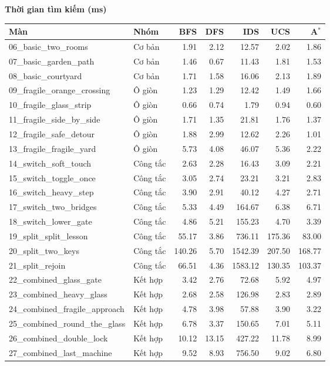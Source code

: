 \vspace{1.1em}

{\textbf{Thời gian tìm kiếm (ms)}}\\[0.4em]
\begin{tabular}{llrrrrr}
\hline
Màn & Nhóm & BFS & DFS & IDS & UCS & A$^*$ \\
\hline
06\_basic\_two\_rooms & Cơ bản & 1.91 & 2.12 & 12.57 & 2.02 & 1.86 \\
07\_basic\_garden\_path & Cơ bản & 1.46 & 0.67 & 11.43 & 1.81 & 1.53 \\
08\_basic\_courtyard & Cơ bản & 1.71 & 1.58 & 16.06 & 2.13 & 1.89 \\
09\_fragile\_orange\_crossing & Ô giòn & 1.23 & 1.29 & 12.42 & 1.49 & 1.66 \\
10\_fragile\_glass\_strip & Ô giòn & 0.66 & 0.74 & 1.79 & 0.94 & 0.60 \\
11\_fragile\_side\_by\_side & Ô giòn & 1.71 & 1.35 & 21.81 & 1.76 & 1.37 \\
12\_fragile\_safe\_detour & Ô giòn & 1.88 & 2.99 & 12.62 & 2.26 & 1.01 \\
13\_fragile\_fragile\_yard & Ô giòn & 5.73 & 4.08 & 46.07 & 5.36 & 2.22 \\
14\_switch\_soft\_touch & Công tắc & 2.63 & 2.28 & 16.43 & 3.09 & 2.21 \\
15\_switch\_toggle\_once & Công tắc & 3.05 & 2.74 & 23.21 & 3.21 & 2.83 \\
16\_switch\_heavy\_step & Công tắc & 3.90 & 2.91 & 40.12 & 4.27 & 2.71 \\
17\_switch\_two\_bridges & Công tắc & 5.33 & 4.49 & 164.67 & 6.38 & 6.71 \\
18\_switch\_lower\_gate & Công tắc & 4.86 & 5.21 & 155.23 & 4.70 & 3.39 \\
19\_split\_split\_lesson & Công tắc & 55.17 & 3.86 & 736.11 & 175.36 & 83.00 \\
20\_split\_two\_keys & Công tắc & 140.26 & 5.70 & 1542.39 & 207.50 & 168.77 \\
21\_split\_rejoin & Công tắc & 66.51 & 4.36 & 1583.12 & 130.35 & 103.37 \\
22\_combined\_glass\_gate & Kết hợp & 3.42 & 2.76 & 72.68 & 5.92 & 4.97 \\
23\_combined\_heavy\_glass & Kết hợp & 2.68 & 2.58 & 126.98 & 2.83 & 2.89 \\
24\_combined\_fragile\_approach & Kết hợp & 4.78 & 3.98 & 57.88 & 3.90 & 3.22 \\
25\_combined\_round\_the\_glass & Kết hợp & 6.78 & 3.37 & 150.65 & 7.01 & 5.11 \\
26\_combined\_double\_lock & Kết hợp & 10.12 & 13.15 & 427.22 & 11.78 & 8.99 \\
27\_combined\_last\_machine & Kết hợp & 9.52 & 8.93 & 756.50 & 9.02 & 6.80 \\
\hline
\end{tabular}

